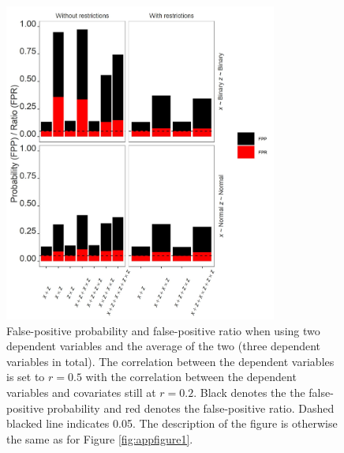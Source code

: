 \begin{figure}[ht!]
\includegraphics[width=0.8\textwidth]{R/Analysis/Result/Figures/Figure3SI.jpeg}
\centering
\caption{False-positive probability and false-positive ratio when using two dependent variables and the average of the two (three dependent variables in total). The correlation between the dependent variables is set to  $\textit{r}=0.5$ with the correlation between the dependent variables and covariates still at  $\textit{r}=0.2$. Black denotes the the false-positive probability and red denotes the false-positive ratio. Dashed blacked line indicates 0.05. The description of the figure is otherwise the same as for Figure \ref{fig:appfigure1}.}
\label{fig:appfigure3}
\end{figure}


